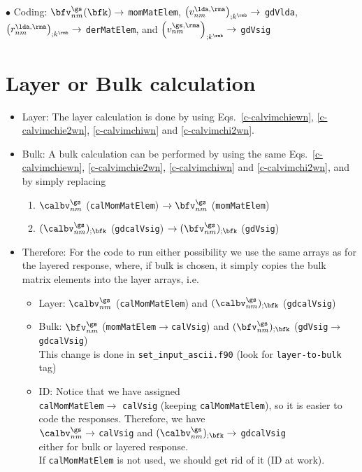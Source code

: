 $\bullet$ Coding:
$\bfv^\gs_{nm}(\bfk)\to$ \verb=momMatElem=,
$\left(v^{\lda,\rma}_{nm}\right)_{;k^\rmb}\to$ \verb=gdVlda=,
$\left(r^{\lda,\rma}_{nm}\right)_{;k^\rmb}\to$ \verb=derMatElem=, and
$\left(v^{\gs,\rma}_{nm}\right)_{;k^\rmb}\to$ \verb=gdVsig=

\section{Layer or Bulk calculation}
\begin{itemize}
\item Layer: The layer calculation is done by using
Eqs.~\eqref{c-calvimchiewn}, \eqref{c-calvimchie2wn}, \eqref{c-calvimchiwn}
 and \eqref{c-calvimchi2wn}. 
\item Bulk:
A bulk calculation can be performed by using the same
Eqs.~\eqref{c-calvimchiewn}, \eqref{c-calvimchie2wn}, \eqref{c-calvimchiwn}
 and \eqref{c-calvimchi2wn}, and by simply replacing
\begin{enumerate}
\item $\calbv^\gs_{nm}$ (\verb=calMomMatElem=) $\to \bfv^\gs_{nm}$ (\verb=momMatElem=) 
\item $(\calbv^\gs_{nm})_{;\bfk}$ (\verb=gdcalVsig=) $\to
  (\bfv^\gs_{nm})_{;\bfk}$ (\verb=gdVsig=) 
\end{enumerate}
\item Therefore: For the code to run either possibility we use the
  same arrays as for the layered response, where, if bulk is chosen, it
  simply copies the bulk matrix elements into the layer arrays, i.e.
\begin{itemize}
\item Layer: 
$\calbv^\gs_{nm}$ (\verb=calMomMatElem=) and
$(\calbv^\gs_{nm})_{;\bfk}$ (\verb=gdcalVsig=) 
\item Bulk:
$\bfv^\gs_{nm}$ (\verb=momMatElem=$\to$\verb=calVsig=) and
$(\bfv^\gs_{nm})_{;\bfk}$ (\verb=gdVsig=$\to$\verb=gdcalVsig=) \\
This change is done in \verb=set_input_ascii.f90= (look for
\verb=layer-to-bulk= tag)
\item ID: Notice that we have assigned\\
  \verb=calMomMatElem=$\to$ \verb=calVsig= (keeping
  \verb=calMomMatElem=), so it is easier to  code the responses.
Therefore, we have\\
$\calbv^\gs_{nm}\to$ \verb=calVsig= and
$(\calbv^\gs_{nm})_{;\bfk}\to$ \verb=gdcalVsig=\\
either for bulk or layered response. \\
If \verb=calMomMatElem= is not used, we should get rid of it (ID at work).
\end{itemize}
\end{itemize}

